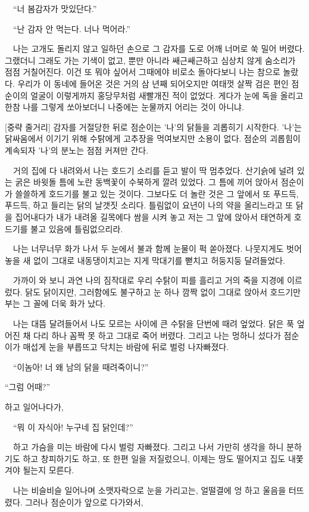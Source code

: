 \documentclass[fs9,seriesRus]{korfarm-base}
\begin{document}
{　“너 봄감자가 맛있단다.”

　“난 감자 안 먹는다. 너나 먹어라.”

　나는 고개도 돌리지 않고 일하던 손으로 그 감자를 도로 어깨 너머로 쑥 밀어 버렸다. 그랬더니 그래도 가는 기색이 없고, 뿐만 아니라 쌔근쌔근하고 심상치 않게 숨소리가 점점 거칠어진다. 이건 또 뭐야 싶어서 그때에야 비로소 돌아다보니 나는 참으로 놀랐다. 우리가 이 동네에 들어온 것은 거의 삼 년째 되어오지만 여태껏 살짝 검은 편인 점순이의 얼굴이 이렇게까지 홍당무처럼 새빨개진 적이 없었다. 게다가 눈에 독을 올리고 한참 나를 그렇게 쏘아보더니 나중에는 눈물까지 어리는 것이 아니냐.

[중략 줄거리] 감자를 거절당한 뒤로 점순이는 '나'의 닭들을 괴롭히기 시작한다. '나'는 닭싸움에서 이기기 위해 수탉에게 고추장을 먹여보지만 소용이 없다. 점순의 괴롭힘이 계속되자 '나'의 분노는 점점 커져만 간다.

　거의 집에 다 내려와서 나는 호드기 소리를 듣고 발이 딱 멈추었다. 산기슭에 널려 있는 굵은 바윗돌 틈에 노란 동백꽃이 수북하게 깔려 있었다. 그 틈에 끼어 앉아서 점순이가 쓸쓸하게 호드기를 불고 있는 것이다. 그보다도 더 놀란 것은 그 앞에서 또 푸드득, 푸드득, 하고 들리는 닭의 날갯짓 소리다. 틀림없이 요년이 나의 약을 올리느라고 또 닭을 집어내다가 내가 내려올 길목에다 쌈을 시켜 놓고 저는 그 앞에 앉아서 태연하게 호드기를 불고 있음에 틀림없으리라.

　나는 너무너무 화가 나서 두 눈에서 불과 함께 눈물이 퍽 쏟아졌다. 나뭇지게도 벗어 놓을 새 없이 그대로 내동댕이치고는 지게 막대기를 뻗치고 허둥지둥 달려들었다.

　가까이 와 보니 과연 나의 짐작대로 우리 수탉이 피를 흘리고 거의 죽을 지경에 이르렀다. 닭도 닭이지만, 그러함에도 불구하고 눈 하나 깜짝 없이 그대로 앉아서 호드기만 부는 그 꼴에 더욱 화가 났다.

　나는 대뜸 달려들어서 나도 모르는 사이에 큰 수탉을 단번에 때려 엎었다. 닭은 푹 엎어진 채 다리 하나 꼼짝 못 하고 그대로 죽어 버렸다. 그리고 나는 멍하니 섰다가 점순이가 매섭게 눈을 부릅뜨고 닥치는 바람에 뒤로 벌렁 나자빠졌다.

　“이놈아! 너 왜 남의 닭을 때려죽이니?”

“그럼 어때?”

하고 일어나다가,

　“뭐 이 자식아! 누구네 집 닭인데?”

　하고 가슴을 미는 바람에 다시 벌렁 자빠졌다. 그리고 나서 가만히 생각을 하니 분하기도 하고 창피하기도 하고, 또 한편 일을 저질렀으니, 이제는 땅도 떨어지고 집도 내쫓겨야 될는지 모른다.

　나는 비슬비슬 일어나며 소맷자락으로 눈을 가리고는, 얼떨결에 엉 하고 울음을 터뜨렸다. 그러나 점순이가 앞으로 다가와서,

}
\end{document}
